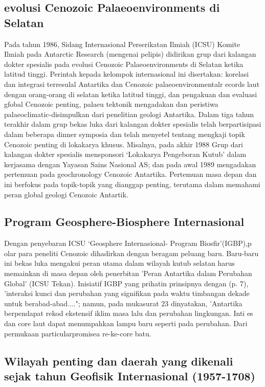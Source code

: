 \subsection{evolusi Cenozoic Palaeoenvironments di Selatan}

		Pada tahun 1986, Sidang Internasional Perserikatan Ilmiah (ICSU) Komite Ilmiah pada Antarctic Research (mengenai pelipis) didirikan grup dari 
	kalangan dokter spesialis pada evolusi Cenozoic Palaeoenvironments di Selatan ketika latitud tinggi. Perintah kepada kelompok internasional ini 
	disertakan: korelasi dan integrasi terresulal Antartika dan Cenozoic palaeoenvironmentalr ecords laut dengan orang-orang di selatan ketika latitud 
	tinggi, dan pengakuan dan evaluasi gfobal Cenozoic penting, palaeu tektonik mengadakan dan peristiwa palaeoclimatic-disimpulkan dari penelitian 
	geologi Antartika. Dalam tiga tahun terakhir dalam grup bekas luka dari kalangan dokter spesialis telah berpartisipasi dalam beberapa dinner symposia 
	dan telah menyetel tentang mengkaji topik Cenozoic penting di lokakarya khusus. Misalnya, pada akhir 1988 Grup dari kalangan dokter spesialis 
	mensponsori `Lokakarya Pengeboran Kutub' dalam kerjasama dengan Yayasan Sains Nasional AS; dan pada awal 1989 mengadakan pertemuan pada geochronology 
	Cenozoic Antartika. Pertemuan masa depan dan ini berfokus pada topik-topik yang dianggap penting, terutama dalam memahami peran global 
	geologi Cenozoic Antartik.
	
	
\subsection{Program Geosphere-Biosphere Internasional}

		Dengan penyebaran ICSU `Geosphere Internasional- Program Biosfir'(IGBP),p olar para peneliti Cenozoic dihadirkan dengan beragam peluang baru. 
	Baru-baru ini bekas luka mengakui peran utama dalam wilayah kutub selatan harus memainkan di masa depan oleh penerbitan 'Peran Antartika dalam 
	Perubahan Global' (ICSU Tekan). Inisiatif IGBP yang prihatin prinsipnya dengan (p. 7), 'interaksi kunci dan perubahan yang signifikan pada waktu 
	timbangan dekade untuk berabad-abad...."; namun, pada mukasurat 23 dinyatakan, 'Antartika berpendapat rekod ekstensif iklim masa lalu dan perubahan lingkungan. 
	Inti es dan core laut dapat menumpahkan lampu baru seperti pada perubahan. Dari permukaan particularpromisea re-ke-core batu.
	
	
\subsection{Wilayah penting dan daerah yang dikenali sejak tahun Geofisik Internasional (1957-1708)}

